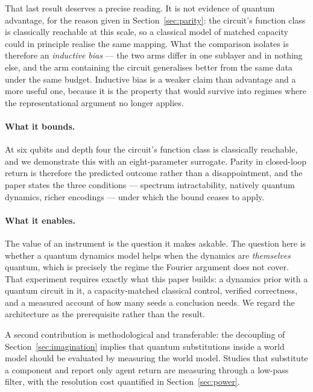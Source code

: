 \documentclass[11pt,onecolumn]{article}
\begin{document}
That last result deserves a precise reading. It is not evidence of
quantum advantage, for the reason given in
Section~\ref{sec:parity}: the circuit's function class is classically
reachable at this scale, so a classical model of matched capacity could
in principle realise the same mapping. What the comparison isolates is
therefore an \emph{inductive bias} --- the two arms differ in one
sublayer and in nothing else, and the arm containing the circuit
generalises better from the same data under the same budget. Inductive
bias is a weaker claim than advantage and a more useful one, because it
is the property that would survive into regimes where the
representational argument no longer applies.

\paragraph{What it bounds.}
At six qubits and depth four the circuit's function class is classically
reachable, and we demonstrate this with an eight-parameter surrogate.
Parity in closed-loop return is therefore the predicted outcome rather
than a disappointment, and the paper states the three conditions ---
spectrum intractability, natively quantum dynamics, richer encodings ---
under which the bound ceases to apply.

\paragraph{What it enables.}
The value of an instrument is the question it makes askable. The
question here is whether a quantum dynamics model helps when the
dynamics are \emph{themselves} quantum, which is precisely the regime
the Fourier argument does not cover. That experiment requires exactly
what this paper builds: a dynamics prior with a quantum circuit in it, a
capacity-matched classical control, verified correctness, and a measured
account of how many seeds a conclusion needs. We regard the architecture
as the prerequisite rather than the result.

A second contribution is methodological and transferable: the
decoupling of Section~\ref{sec:imagination} implies that quantum
substitutions inside a world model should be evaluated by measuring the
world model. Studies that substitute a component and report only agent
return are measuring through a low-pass filter, with the resolution cost
quantified in Section~\ref{sec:power}.

\end{document}
